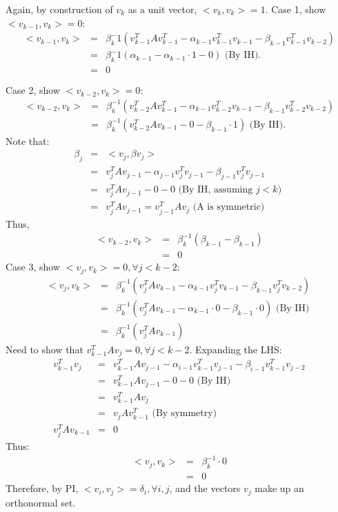 \documentclass{article}
\newcommand{\ea}[1]{\begin{eqnarray*}#1\end{eqnarray*}}
\begin{document}
Again, by construction of $v_k$ as a unit vector, $<v_k,v_k>=1$.
Case 1, show $<v_{k-1},v_k>=0$:
\ea{
<v_{k-1}, v_k> &=& \beta_k^-1 \left( v_{k-1}^T A v_{k-1}^T 
	- \alpha_{k-1} v_{k-1}^T v_{k-1} - \beta_{k-1} v_{k-1}^T v_{k-2} \right) \\
	&=& \beta_k^-1 \left( \alpha_{k-1} - \alpha_{k-1} \cdot 1 - 0 \right) \textrm{  (By IH). } \\
	&=& 0 \\
	\\
}
Case 2, show $<v_{k-2},v_k>=0$:
\ea{
<v_{k-2}, v_k> &=& \beta_k^{-1} \left( v_{k-2}^T A v_{k-1}^T 
    - \alpha_{k-1} v_{k-2}^T v_{k-1} - \beta_{k-1} v_{k-2}^T v_{k-2} \right) \\
	&=& \beta_k^{-1} \left( v_{k-2}^T A v_{k-1} - 0 - \beta_{k-1}\cdot 1 \right) \textrm{   (By IH). }
}
Note that:
\ea{
	\beta_j &=& <v_j,\beta v_j> \\
	&=& v_j^T A v_{j-1} - \alpha_{j-1} v_j^T v_{j-1} - \beta_{j-1} v_j^T v_{j-1} \\
	&=& v_j^T A v_{j-1} - 0 - 0 \textrm{   (By IH, assuming $j<k$)   }\\
	&=& v_j^T A v_{j-1} = v_{j-1}^T A v_{j} \textrm{   (A is symmetric) }
}
Thus, 
\ea{
<v_{k-2}, v_k> &=& \beta_k^{-1} \left( \beta_{k-1} - \beta_{k-1} \right)\\
&=& 0
}
Case 3, show $<v_j,v_k>=0, \forall j<k-2$:
\ea{
<v_j,v_k> &=& \beta_k^{-1} \left( v_j^T A v_{k-1} - \alpha_{k-1} v_{j}^T v_{k-1} - \beta_{k-1} v_j^T v_{k-2} \right) \\
&=& \beta_k^{-1} \left( v_j^T A v_{k-1} - \alpha_{k-1} \cdot 0 - \beta_{k-1} \cdot 0 \right) \textrm{    (By IH) }\\
&=& \beta_k^{-1} \left( v_j^T A v_{k-1} \right)
}
Need to show that $v_{k-1}^T A v_j = 0, \forall j<k-2$. Expanding the LHS:
\ea{
v_{k-1}^T v_j &=& v_{k-1}^T A v_{j-1} - \alpha_{i-1} v_{k-1}^T v_{j-1} - \beta_{i-1} v_{k-1}^T v_{j-2} \\
&=& v_{k-1}^T A v_{j-1} - 0 - 0 \textrm{    (By IH)}\\
&=& v_{k-1}^T A v_j\\
&=& v_j A v_{k-1}^T \textrm{  (By symmetry) }\\
v_j^T A v_{k-1} &=& 0
}
Thus:
\ea{
<v_j,v_k> &=& \beta_k^{-1} \cdot 0 \\
&=& 0
}
Therefore, by PI, $<v_i,v_j>=\delta_i,\forall i,j$, and the vectors ${v_j}$ make up an orthonormal set.
\end{document}

